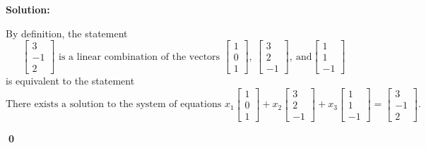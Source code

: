 \documentclass{article}
\newenvironment{solution}
{
  \ignorespaces
  \textbf{Solution:}
}
{
  \ignorespacesafterend
  \begin{flushright}
  {\bfseries \qed}
  \end{flushright}
}
\begin{document}
\begin{solution}
By definition, the statement 
\[\begin{bmatrix} 3 \\ -1 \\ 2 \end{bmatrix} \text{ is a linear combination of the vectors }
\begin{bmatrix} 1 \\ 0 \\ 1 \end{bmatrix},\ 
\begin{bmatrix} 3 \\ 2 \\ -1 \end{bmatrix},\ \text{and} 
\begin{bmatrix} 1 \\ 1 \\ -1 \end{bmatrix} \] 
is equivalent to the statement
\[\text{There exists a solution to the system of equations } 
x_1\begin{bmatrix} 1 \\ 0 \\ 1 \end{bmatrix} +
x_2\begin{bmatrix} 3 \\ 2 \\ -1 \end{bmatrix} +
x_3\begin{bmatrix} 1 \\ 1 \\ -1 \end{bmatrix} =
\begin{bmatrix} 3 \\ -1 \\ 2 \end{bmatrix}.\]


\end{solution}
\end{document}
